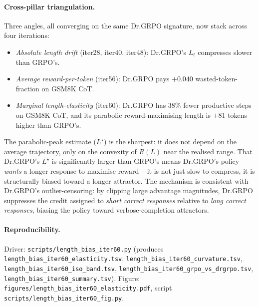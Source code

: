 \paragraph{Cross-pillar triangulation.}
Three angles, all converging on the same Dr.GRPO signature, now stack
across four iterations:
\begin{itemize}
\item \emph{Absolute length drift} (iter28, iter40, iter48):
      Dr.GRPO's $L_t$ compresses slower than GRPO's.
\item \emph{Average reward-per-token} (iter56): Dr.GRPO pays
      $+0.040$ wasted-token-fraction on GSM8K CoT.
\item \emph{Marginal length-elasticity} (iter60): Dr.GRPO has $38\%$
      fewer productive steps on GSM8K CoT, and its parabolic
      reward-maximising length is $+81$ tokens higher than GRPO's.
\end{itemize}
The parabolic-peak estimate ($L^\star$) is the sharpest: it does not
depend on the average trajectory, only on the convexity of $R(L)$
near the realised range. That Dr.GRPO's $L^\star$ is significantly
larger than GRPO's means Dr.GRPO's policy \emph{wants} a longer
response to maximise reward -- it is not just slow to compress, it
is structurally biased toward a longer attractor. The mechanism is
consistent with Dr.GRPO's outlier-censoring: by clipping large
advantage magnitudes, Dr.GRPO suppresses the credit assigned to
\textit{short correct responses} relative to \textit{long correct
responses}, biasing the policy toward verbose-completion attractors.

\paragraph{Reproducibility.}
Driver: \texttt{scripts/length\_bias\_iter60.py} (produces
\texttt{length\_bias\_iter60\_elasticity.tsv},
\texttt{length\_bias\_iter60\_curvature.tsv},
\texttt{length\_bias\_iter60\_iso\_band.tsv},
\texttt{length\_bias\_iter60\_grpo\_vs\_drgrpo.tsv},
\texttt{length\_bias\_iter60\_summary.tsv}).
Figure: \texttt{figures/length\_bias\_iter60\_elasticity.pdf},
script \texttt{scripts/length\_bias\_iter60\_fig.py}.